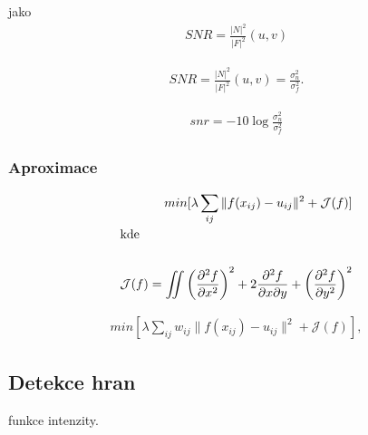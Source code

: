 jako
\begin{eqnarray}
SNR=\frac{|N|^2}{|F|^2}(u,v)
\end{eqnarray}


\begin{eqnarray}
SNR=\frac{|N|^2}{|F|^2}(u,v)=\frac{\sigma_n^2}{\sigma_f^2}.
\end{eqnarray}


\begin{eqnarray}
snr=-10\log\frac{\sigma_n^2}{\sigma_f^2}
\end{eqnarray}


\subsubsection{Aproximace}


\begin{eqnarray}
min[\lambda \sum\limits_{ij} \|f(x_{ij})-u_{ij}\|^2+\mathcal{J}(f)]\\
\noalign{\hbox{kde}\nonumber}\\
\mathcal{J}(f)=\int\!\!\!\!\int\left(\frac{\partial^2f}{\partial x^2}\right)^2+2\frac{\partial^2f}{\partial x\partial y}+
\left(\frac{\partial^2f}{\partial y^2}\right)^2
\end{eqnarray}


\begin{eqnarray}
min[\lambda \sum\limits_{ij}w_{ij}\|f(x_{ij})-u_{ij}\|^2+\mathcal{J}(f)],
\end{eqnarray}


\subsection{Detekce hran}

\begin{description}
\end{description}

funkce intenzity.


